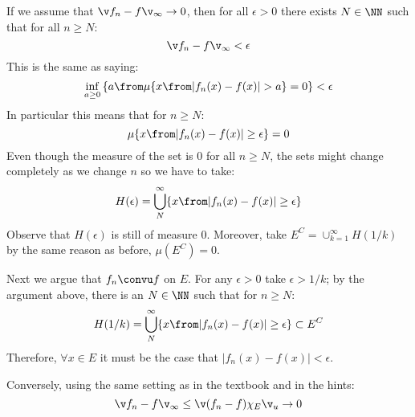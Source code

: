 If we assume that $\v f_n - f\v_\infty\to 0$, then for all $\epsilon>0$ there exists $N\in \NN $ such that for all $n\geq N$:
$$\v f_n - f\v_\infty < \epsilon$$
This is the same as saying:
$$\inf_{a\geq 0}\left \{ a\from \mu\{ x\from | f_n(x) - f(x)| > a\}=0\right\}<\epsilon$$
In particular this means that for $n\geq N$:
$$\mu\{ x\from |f_n(x) - f(x)|\geq  \epsilon \}=0$$
Even though the measure of the set is 0 for all $n\geq N$, the sets might change completely as we change $n$ so we have to take:
$$H(\epsilon) =\bigcup_N^\infty  \{ x\from |f_n(x) - f(x)|\geq  \epsilon \}$$
Observe that $H(\epsilon)$ is still of measure 0. 
Moreover, take $E^C = \cup_{k=1}^\infty H(1/k)$ by the same reason as before, $\mu(E^C)=0$.

Next we argue that $f_n\convu f$ on $E$. 
For any $\epsilon >0$ take $\epsilon > 1/k$; by the argument above, there is an $N\in \NN$ such that for $n\geq N$:
$$H(1/k)= \bigcup_N^\infty  \{ x\from |f_n(x) - f(x)|\geq  \epsilon \}\subset E^C$$
Therefore, $\forall x\in E$ it must be the case that $|f_n(x) -f(x)| < \epsilon$.

Conversely, using the same setting as in the textbook and in the hints:
$$\v f_n -f\v_\infty \leq \v (f_n -f) \chi_E\v_u\to 0$$ 
